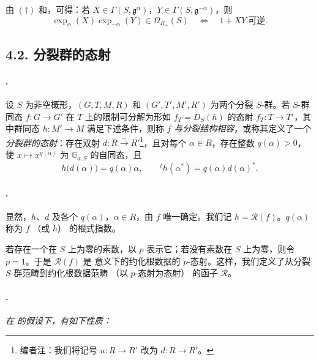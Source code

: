 由 \((\dagger)\) 和，可得：若 \(X\in\Gamma(S,\mathfrak g^\alpha)\)，\(Y\in\Gamma(S,\mathfrak g^{-\alpha})\)，则
\[
  \exp_\alpha(X)\exp_{-\alpha}(Y)\in\Omega_{R_+}(S)
  \quad\Longleftrightarrow\quad
  1+XY\ \text{可逆}.
\]

\subsection*{4.2. 分裂群的态射}

\paragraph{.}
设 \(S\) 为非空概形，\((G,T,M,R)\) 和 \((G',T',M',R')\) 为两个分裂 \(S\)-群。若 \(S\)-群同态 \(f:G\to G'\) 在 \(T\) 上的限制可分解为形如 \(f_T=D_S(h)\) 的态射 \(f_T:T\to T'\)，其中群同态 \(h:M'\to M\) 满足下述条件，则称 \(f\) \emph{与分裂结构相容}，或称其定义了一个\emph{分裂群的态射}：存在双射 \(d:R\xrightarrow{\sim}R'\)\footnote{编者注：我们将记号 \(u:R\to R'\) 改为 \(d:R\to R'\)。}，且对每个 \(\alpha\in R\)，存在整数 \(q(\alpha)>0\)，使 \(x\mapsto x^{q(\alpha)}\) 为 \(\mathbb G_{a,S}\) 的自同态，且
\[
  h\bigl(d(\alpha)\bigr)=q(\alpha)\alpha,
  \qquad
  {}^t h(\alpha^*)=q(\alpha)d(\alpha)^*.
\]

\paragraph{.}
显然，\(h\)、\(d\) 及各个 \(q(\alpha)\)，\(\alpha\in R\)，由 \(f\) 唯一确定。我们记 \(h=\mathscr R(f)\)。\(q(\alpha)\) 称为 \(f\) \textup{（或 \(h\)）} 的根式指数。

若存在一个在 \(S\) 上为零的素数，以 \(p\) 表示它；若没有素数在 \(S\) 上为零，则令 \(p=1\)。于是 \(\mathscr R(f)\) 是 意义下的约化根数据的 \(p\)-态射。这样，我们定义了从分裂 \(S\)-群范畴到约化根数据范畴 \textup{（以 \(p\)-态射为态射）} 的函子 \(\mathscr R\)。

\paragraph{.}
\textit{在  的假设下，有如下性质：}

